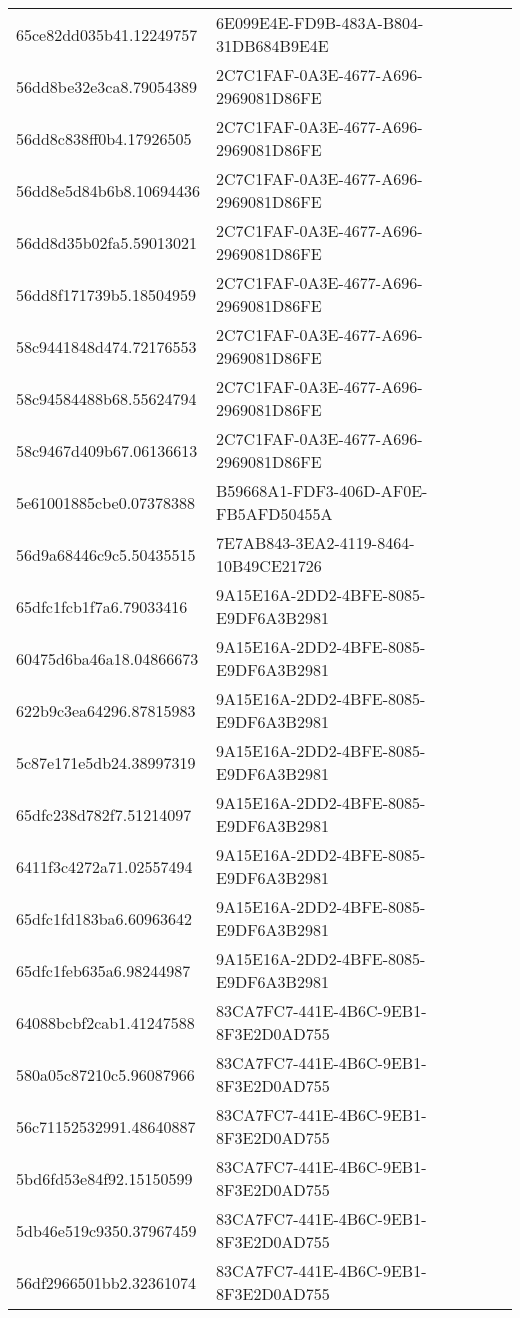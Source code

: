 \begin{tabular}{ll}
65ce82dd035b41.12249757 & 6E099E4E-FD9B-483A-B804-31DB684B9E4E \\
56dd8be32e3ca8.79054389 & 2C7C1FAF-0A3E-4677-A696-2969081D86FE \\
56dd8c838ff0b4.17926505 & 2C7C1FAF-0A3E-4677-A696-2969081D86FE \\
56dd8e5d84b6b8.10694436 & 2C7C1FAF-0A3E-4677-A696-2969081D86FE \\
56dd8d35b02fa5.59013021 & 2C7C1FAF-0A3E-4677-A696-2969081D86FE \\
56dd8f171739b5.18504959 & 2C7C1FAF-0A3E-4677-A696-2969081D86FE \\
58c9441848d474.72176553 & 2C7C1FAF-0A3E-4677-A696-2969081D86FE \\
58c94584488b68.55624794 & 2C7C1FAF-0A3E-4677-A696-2969081D86FE \\
58c9467d409b67.06136613 & 2C7C1FAF-0A3E-4677-A696-2969081D86FE \\
5e61001885cbe0.07378388 & B59668A1-FDF3-406D-AF0E-FB5AFD50455A \\
56d9a68446c9c5.50435515 & 7E7AB843-3EA2-4119-8464-10B49CE21726 \\
65dfc1fcb1f7a6.79033416 & 9A15E16A-2DD2-4BFE-8085-E9DF6A3B2981 \\
60475d6ba46a18.04866673 & 9A15E16A-2DD2-4BFE-8085-E9DF6A3B2981 \\
622b9c3ea64296.87815983 & 9A15E16A-2DD2-4BFE-8085-E9DF6A3B2981 \\
5c87e171e5db24.38997319 & 9A15E16A-2DD2-4BFE-8085-E9DF6A3B2981 \\
65dfc238d782f7.51214097 & 9A15E16A-2DD2-4BFE-8085-E9DF6A3B2981 \\
6411f3c4272a71.02557494 & 9A15E16A-2DD2-4BFE-8085-E9DF6A3B2981 \\
65dfc1fd183ba6.60963642 & 9A15E16A-2DD2-4BFE-8085-E9DF6A3B2981 \\
65dfc1feb635a6.98244987 & 9A15E16A-2DD2-4BFE-8085-E9DF6A3B2981 \\
64088bcbf2cab1.41247588 & 83CA7FC7-441E-4B6C-9EB1-8F3E2D0AD755 \\
580a05c87210c5.96087966 & 83CA7FC7-441E-4B6C-9EB1-8F3E2D0AD755 \\
56c71152532991.48640887 & 83CA7FC7-441E-4B6C-9EB1-8F3E2D0AD755 \\
5bd6fd53e84f92.15150599 & 83CA7FC7-441E-4B6C-9EB1-8F3E2D0AD755 \\
5db46e519c9350.37967459 & 83CA7FC7-441E-4B6C-9EB1-8F3E2D0AD755 \\
56df2966501bb2.32361074 & 83CA7FC7-441E-4B6C-9EB1-8F3E2D0AD755 \\

\end{tabular}
